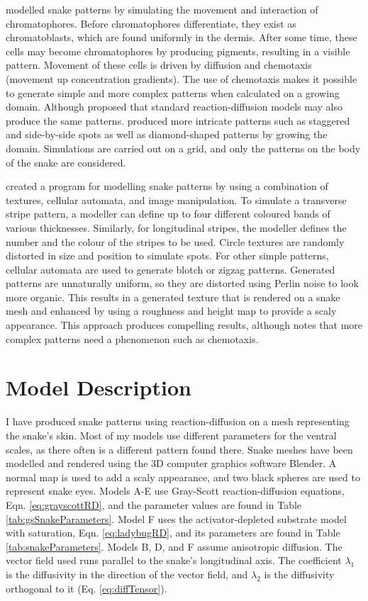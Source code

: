 \citet{murray1991} modelled snake patterns by simulating the movement and interaction of chromatophores. Before chromatophores differentiate, they exist as chromatoblasts, which are found uniformly in the dermis. After some time, these cells may become chromatophores by producing pigments, resulting in a visible pattern. Movement of these cells is driven by diffusion and chemotaxis (movement up concentration gradients). The use of chemotaxis makes it possible to generate simple and more complex patterns when calculated on a growing domain. Although \citet{murray1991} proposed that standard reaction-diffusion models may also produce the same patterns. \citet{murray1991} produced more intricate patterns such as staggered and side-by-side spots as well as diamond-shaped patterns by growing the domain. Simulations are carried out on a grid, and only the patterns on the body of the snake are considered.

\citet{pinheiro2017} created a program for modelling snake patterns by using a combination of textures, cellular automata, and image manipulation. To simulate a transverse stripe pattern, a modeller can define up to four different coloured bands of various thicknesses. Similarly, for longitudinal stripes, the modeller defines the number and the colour of the stripes to be used. Circle textures are randomly distorted in size and position to simulate spots. For other simple patterns, cellular automata are used to generate blotch or zigzag patterns. Generated patterns are unnaturally uniform, so they are distorted using Perlin noise to look more organic. This results in a generated texture that is rendered on a snake mesh and enhanced by using a roughness and height map to provide a scaly appearance. This approach produces compelling results, although \citet{pinheiro2017} notes that more complex patterns need a phenomenon such as chemotaxis.

\section{Model Description}
I have produced snake patterns using reaction-diffusion on a mesh representing the snake's skin. Most of my models use different parameters for the ventral scales, as there often is a different pattern found there. Snake meshes have been modelled and rendered using the 3D computer graphics software Blender. A normal map is used to add a scaly appearance, and two black spheres are used to represent snake eyes. Models A-E use Gray-Scott reaction-diffusion equations, Eqn. \ref{eq:grayscottRD}, and the parameter values are found in Table \ref{tab:gsSnakeParameters}. Model F uses the activator-depleted substrate model with saturation, Eqn. \ref{eq:ladybugRD}, and its parameters are found in Table \ref{tab:snakeParameters}. Models B, D, and F assume anisotropic diffusion. The vector field used runs parallel to the snake's longitudinal axis. The coefficient $\lambda_{1}$ is the diffusivity in the direction of the vector field, and $\lambda_{2}$ is the diffusivity orthogonal to it (Eq. \ref{eq:diffTensor}). 


